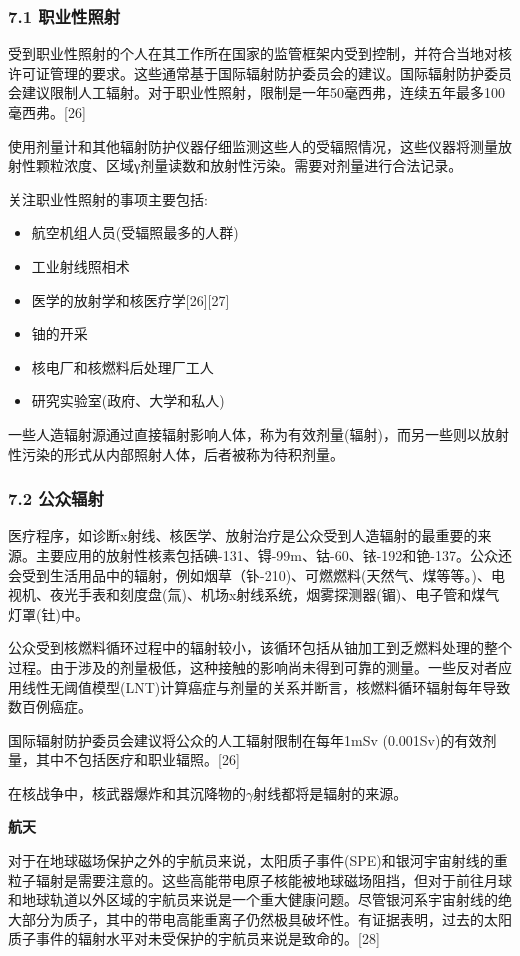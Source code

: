 \subsubsection{7.1 职业性照射}
受到职业性照射的个人在其工作所在国家的监管框架内受到控制，并符合当地对核许可证管理的要求。这些通常基于国际辐射防护委员会的建议。国际辐射防护委员会建议限制人工辐射。对于职业性照射，限制是一年50毫西弗，连续五年最多100毫西弗。[26]

使用剂量计和其他辐射防护仪器仔细监测这些人的受辐照情况，这些仪器将测量放射性颗粒浓度、区域γ剂量读数和放射性污染。需要对剂量进行合法记录。

关注职业性照射的事项主要包括:
\begin{itemize}
\item 航空机组人员(受辐照最多的人群)
\item 工业射线照相术
\item 医学的放射学和核医疗学[26][27]
\item 铀的开采
\item 核电厂和核燃料后处理厂工人
\item 研究实验室(政府、大学和私人)
\end{itemize}
一些人造辐射源通过直接辐射影响人体，称为有效剂量(辐射)，而另一些则以放射性污染的形式从内部照射人体，后者被称为待积剂量。

\subsubsection{7.2 公众辐射}
医疗程序，如诊断x射线、核医学、放射治疗是公众受到人造辐射的最重要的来源。主要应用的放射性核素包括碘-131、锝-99m、钴-60、铱-192和铯-137。公众还会受到生活用品中的辐射，例如烟草（钋-210)、可燃燃料(天然气、煤等等。)、电视机、夜光手表和刻度盘(氚)、机场x射线系统，烟雾探测器(镅)、电子管和煤气灯罩(钍)中。

公众受到核燃料循环过程中的辐射较小，该循环包括从铀加工到乏燃料处理的整个过程。由于涉及的剂量极低，这种接触的影响尚未得到可靠的测量。一些反对者应用线性无阈值模型(LNT)计算癌症与剂量的关系并断言，核燃料循环辐射每年导致数百例癌症。

国际辐射防护委员会建议将公众的人工辐射限制在每年1mSv (0.001Sv)的有效剂量，其中不包括医疗和职业辐照。[26]

在核战争中，核武器爆炸和其沉降物的$\gamma$射线都将是辐射的来源。

\textbf{航天}

对于在地球磁场保护之外的宇航员来说，太阳质子事件(SPE)和银河宇宙射线的重粒子辐射是需要注意的。这些高能带电原子核能被地球磁场阻挡，但对于前往月球和地球轨道以外区域的宇航员来说是一个重大健康问题。尽管银河系宇宙射线的绝大部分为质子，其中的带电高能重离子仍然极具破坏性。有证据表明，过去的太阳质子事件的辐射水平对未受保护的宇航员来说是致命的。[28]

